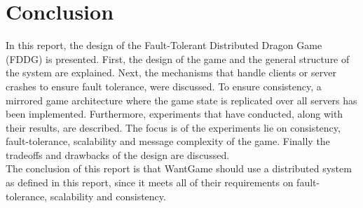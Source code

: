 \section{Conclusion}
In this report, the design of the Fault-Tolerant Distributed Dragon Game (FDDG) is presented. First, the design of the game and the general structure of the system are explained. Next, the mechanisms that handle clients or server crashes to ensure fault tolerance, were discussed. To ensure consistency, a mirrored game architecture where the game state is replicated over all servers has been implemented. Furthermore, experiments that have conducted, along with their results, are described. The focus is of the experiments lie on consistency, fault-tolerance, scalability and message complexity of the game. Finally the tradeoffs and drawbacks of the design are discussed.\\
The conclusion of this report is that WantGame should use a distributed system as defined in this report, since it meets all of their requirements on fault-tolerance, scalability and consistency.
